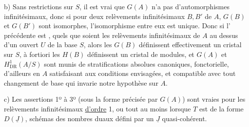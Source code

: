 b) Sans restrictions sur $S$, il est vrai que $G(A)$ n'a pas d'automorphismes infinitésimaux, donc si pour deux relèvements infinitésimaux  $B,B'$ de $A$, $G(B)$ et $G(B')$\deleted{\unsure{,}} sont isomorphes, l'isomorphisme entre eux est unique. Donc si l'  précédente est  , quels que soient les relèvements infinitésimaux de $A$ au dessus d'un ouvert $U$ de la base $S$, alors les $G(B)$ définissent effectivement un cristal  sur $S$, à fortiori les $H(B)$ définissent un cristal de modules, et $G(A)$ et $H^1_{\operatorname{DR}}(A/S)$ sont munis de stratifications absolues canoniques, fonctorielle, d'ailleurs en $A$ satisfaisant aux conditions envisagées, et compatible avec tout changement de base qui invarie notre hypothèse sur $A$.

c) Les assertions 1º à 3º (sous la forme précisée par $G(A)$) sont vraies pour les relèvements infinitésimaux \uline{d'ordre} 1, ou tout au moins lorsque $T$ est de la forme $D(\underline{J})$, schémas des nombres duaux défini par un $\underline{J}$ quasi-cohérent.

